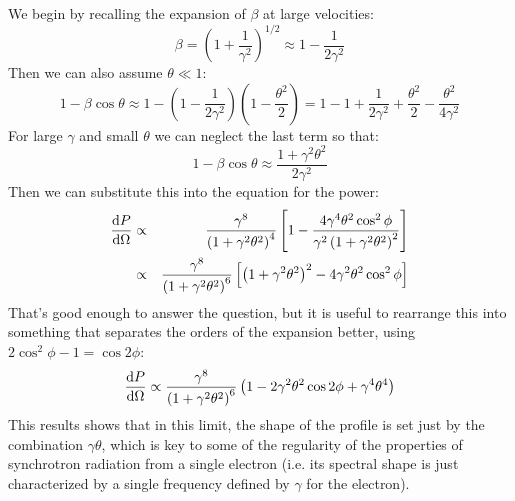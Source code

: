 \documentclass[11pt, preprint]{article}
\begin{document}
\begin{enumerate}
  \begin{answer}
    We begin by recalling the expansion of $\beta$ at large
    velocities:
    \begin{equation}
      \beta = \left(1 + \frac{1}{\gamma^2}\right)^{1/2} \approx 1 -
      \frac{1}{2\gamma^2} 
    \end{equation}
    Then we can also assume $\theta\ll 1$:
    \begin{equation}
      1 - \beta\cos\theta \approx 1-
      \left(1-\frac{1}{2\gamma^2}\right) \left(1 -
      \frac{\theta^2}{2}\right) = 1 - 1 + \frac{1}{2\gamma^2} +
      \frac{\theta^2}{2} - \frac{\theta^2}{4\gamma^2}
    \end{equation}
    For large $\gamma$ and small $\theta$ we can neglect the last
    term so that:
    \begin{equation}
      1 - \beta\cos\theta \approx 
      \frac{1 + \gamma^2\theta^2}{2\gamma^2}
    \end{equation}
    Then we can substitute this into the equation for the power:    
  \begin{eqnarray}
    \frac{{\rm d}P}{{\rm d}\Omega} &\propto&
    \frac{\gamma^8}{\left(1 + \gamma^2\theta^2\right)^4}
    \left[1 - \frac{4 \gamma^4 \theta^2 \cos^2\phi}{\gamma^2 
        \left(1 + \gamma^2\theta^2 \right)^2}\right]\cr
    &\propto&
    \frac{\gamma^8}{\left(1 + \gamma^2\theta^2\right)^6}
    \left[\left(1 + \gamma^2\theta^2\right)^2 - 4 \gamma^2 \theta^2
      \cos^2\phi \right]
  \end{eqnarray}
  That's good enough to answer the question, but it is useful to
  rearrange this into something that separates the orders of the
  expansion better, using $2\cos^2\phi - 1= \cos 2\phi$:
  \begin{equation}
    \frac{{\rm d}P}{{\rm d}\Omega} \propto
    \frac{\gamma^8}{\left(1 + \gamma^2\theta^2\right)^6}
    \left(1 - 2\gamma^2\theta^2 \cos 2\phi + \gamma^4\theta^4\right)
  \end{equation}
  This results shows that in this limit, the shape of the profile is
  set just by the combination $\gamma\theta$, which is key to some of
  the regularity of the properties of synchrotron radiation from a
  single electron (i.e. its spectral shape is just characterized by a
  single frequency defined by $\gamma$ for the electron).
  \end{answer}
  
\end{enumerate}
\end{document}
